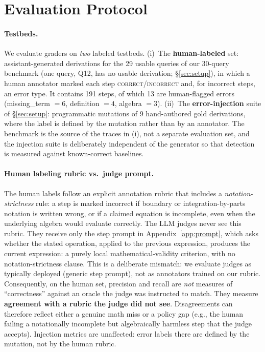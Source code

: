 \section{Evaluation Protocol}
\label{sec:protocol}

\paragraph{Testbeds.}
We evaluate graders on \emph{two} labeled testbeds. (i)~The
\textbf{human-labeled} set: assistant-generated derivations for the 29 usable
queries of our 30-query benchmark (one query, Q12, has no usable derivation;
\S\ref{sec:setup}), in which a human annotator marked each step
\textsc{correct}/\textsc{incorrect} and, for incorrect steps, an error type. It
contains 191 steps, of which 13 are human-flagged errors (missing\_term $=6$,
definition $=4$, algebra $=3$). (ii)~The \textbf{error-injection} suite of
\S\ref{sec:setup}: programmatic mutations of 9 hand-authored gold derivations,
where the label is defined by the mutation rather than by an annotator. The
benchmark is the source of the traces in (i), not a separate evaluation set, and
the injection suite is deliberately independent of the generator so that
detection is measured against known-correct baselines.

\paragraph{Human labeling rubric vs.\ judge prompt.}
The human labels follow an explicit annotation rubric that includes a
\emph{notation-strictness} rule: a step is marked incorrect if boundary or
integration-by-parts notation is written wrong, or if a claimed equation is
incomplete, even when the underlying algebra would evaluate correctly. The LLM
judges never see this rubric. They receive only the step prompt in
Appendix~\ref{app:prompt}, which asks whether the stated operation, applied to
the previous expression, produces the current expression: a purely local
mathematical-validity criterion, with no notation-strictness clause. This is a
deliberate mismatch: we evaluate judges as typically deployed (generic step
prompt), not as annotators trained on our rubric. Consequently, on the human
set, precision and recall are \emph{not} measures of ``correctness'' against an
oracle the judge was instructed to match. They measure \textbf{agreement with a
rubric the judge did not see}. Disagreements can therefore reflect either a
genuine math miss or a policy gap (e.g., the human failing a notationally
incomplete but algebraically harmless step that the judge accepts). Injection
metrics are unaffected: error labels there are defined by the mutation, not by
the human rubric.

